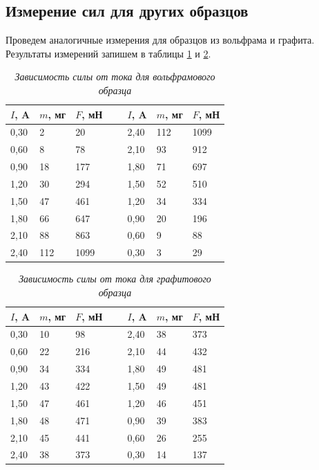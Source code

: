 \documentclass[a4paper,12pt]{article}
\begin{document}
\subsection{Измерение сил для других образцов}

Проведем аналогичные измерения для образцов из вольфрама и графита. Результаты измерений запишем в таблицы \ref{table:3} и \ref{table:4}.

\begin{table}[!ht]
    \centering
    \begin{tabular}{|l|l|l|l|l|l|l|}
    \hline
        $I$, A & $m$, мг & $F$, мН & ~ & $I$, A & $m$, мг & $F$, мН \\ \hline
        0,30 & 2 & 20 & ~ & 2,40 & 112 & 1099 \\ \hline
        0,60 & 8 & 78 & ~ & 2,10 & 93 & 912 \\ \hline
        0,90 & 18 & 177 & ~ & 1,80 & 71 & 697 \\ \hline
        1,20 & 30 & 294 & ~ & 1,50 & 52 & 510 \\ \hline
        1,50 & 47 & 461 & ~ & 1,20 & 34 & 334 \\ \hline
        1,80 & 66 & 647 & ~ & 0,90 & 20 & 196 \\ \hline
        2,10 & 88 & 863 & ~ & 0,60 & 9 & 88 \\ \hline
        2,40 & 112 & 1099 & ~ & 0,30 & 3 & 29 \\ \hline
    \end{tabular}\caption{\textit{Зависимость силы от тока для вольфрамового образца}}\label{table:3}
\end{table}

\begin{table}[!ht]
    \centering
    \begin{tabular}{|l|l|l|l|l|l|l|}
    \hline
        $I$, A & $m$, мг & $F$, мН & ~ & $I$, A & $m$, мг & $F$, мН \\ \hline
        0,30 & 10 & 98 & ~ & 2,40 & 38 & 373 \\ \hline
        0,60 & 22 & 216 & ~ & 2,10 & 44 & 432 \\ \hline
        0,90 & 34 & 334 & ~ & 1,80 & 49 & 481 \\ \hline
        1,20 & 43 & 422 & ~ & 1,50 & 49 & 481 \\ \hline
        1,50 & 47 & 461 & ~ & 1,20 & 46 & 451 \\ \hline
        1,80 & 48 & 471 & ~ & 0,90 & 39 & 383 \\ \hline
        2,10 & 45 & 441 & ~ & 0,60 & 26 & 255 \\ \hline
        2,40 & 38 & 373 & ~ & 0,30 & 14 & 137 \\ \hline
    \end{tabular}\caption{\textit{Зависимость силы от тока для графитового образца}}\label{table:4}
\end{table}
\end{document}

